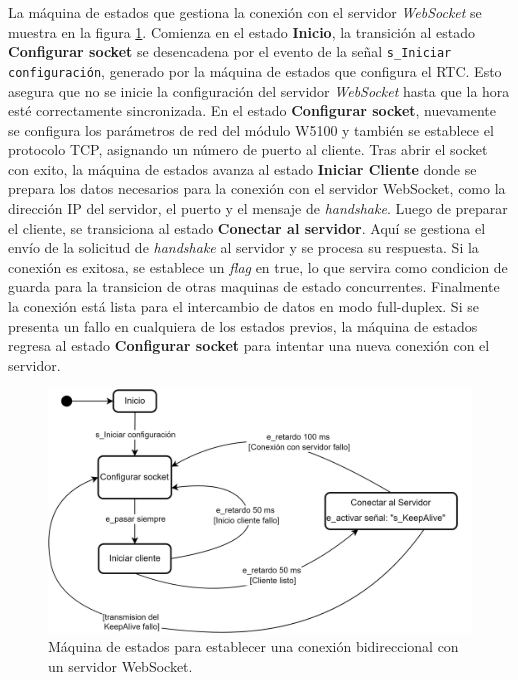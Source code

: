 La máquina de estados que gestiona la conexión con el servidor \textit{WebSocket} se muestra en la figura \ref{fig:sc_connectionWebSocket}. Comienza en el estado \textbf{Inicio}, la transición al estado \textbf{Configurar socket} se desencadena por el evento de la señal \texttt{s\_Iniciar configuración}, generado por la máquina de estados que configura el RTC. Esto asegura que no se inicie la configuración del servidor \textit{WebSocket} hasta que la hora esté correctamente sincronizada. En el estado \textbf{Configurar socket}, nuevamente se configura  los parámetros de red del módulo W5100 y también se establece el protocolo TCP, asignando un número de puerto al cliente. Tras abrir el socket con exito, la máquina de estados avanza al estado \textbf{Iniciar Cliente} donde se prepara los datos necesarios para la conexión con el servidor WebSocket, como la dirección IP del servidor, el puerto y el mensaje de \textit{handshake}. Luego de preparar el cliente, se transiciona al estado \textbf{Conectar al servidor}. Aquí se gestiona el envío de la solicitud de \textit{handshake} al servidor y se procesa su respuesta. Si la conexión es exitosa, se establece un \textit{flag} en true, lo que servira como condicion de guarda para la transicion de otras maquinas de estado concurrentes. Finalmente la conexión está lista para el intercambio de datos en modo full-duplex. Si se presenta un fallo en cualquiera de los estados previos, la máquina de estados regresa al estado \textbf{Configurar socket} para intentar una nueva conexión con el servidor.

\begin{figure}[H]
    \centering
    \includegraphics[width=0.8\linewidth]{Figuras/datalogger/Firmware/sc_connectionWebSocket.png}
    \caption{Máquina de estados para establecer una conexión bidireccional con un servidor WebSocket.}
    \label{fig:sc_connectionWebSocket}
\end{figure}

